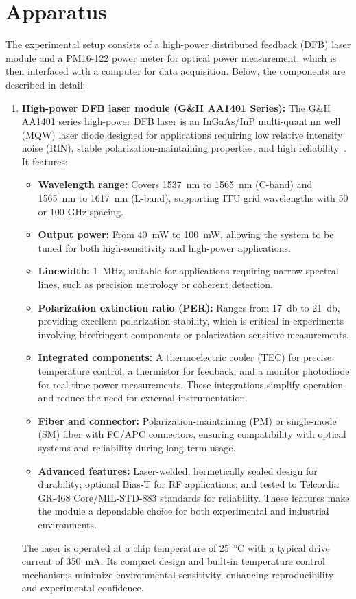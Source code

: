 \documentclass[prl,twocolumn]{revtex4-1}
\begin{document}
\section{Apparatus}

The experimental setup consists of a high-power distributed feedback (DFB) laser module and a PM16-122 power meter for optical power measurement, which is then interfaced with a computer for data acquisition. Below, the components are described in detail:

\begin{enumerate}
    \item \textbf{High-power DFB laser module (G\&H AA1401 Series):}
    The G\&H AA1401 series high-power DFB laser is an InGaAs/InP multi-quantum well (MQW) laser diode designed for applications requiring low relative intensity noise (RIN), stable polarization-maintaining properties, and high reliability~\cite{pap4}. It features:
    \begin{itemize}[noitemsep]
        \item \textbf{Wavelength range:} Covers \SI{1537}{\nano\meter} to \SI{1565}{\nano\meter} (C-band) and \SI{1565}{\nano\meter} to \SI{1617}{\nano\meter} (L-band), supporting ITU grid wavelengths with 50 or 100 GHz spacing.
        \item \textbf{Output power:} From \SI{40}{\milli\watt} to \SI{100}{\milli\watt}, allowing the system to be tuned for both high-sensitivity and high-power applications.
        \item \textbf{Linewidth:} \SI{1}{\mega\hertz}, suitable for applications requiring narrow spectral lines, such as precision metrology or coherent detection.
        \item \textbf{Polarization extinction ratio (PER):} Ranges from \SI{17}{\decibel} to \SI{21}{\decibel}, providing excellent polarization stability, which is critical in experiments involving birefringent components or polarization-sensitive measurements.
        \item \textbf{Integrated components:} A thermoelectric cooler (TEC) for precise temperature control, a thermistor for feedback, and a monitor photodiode for real-time power measurements. These integrations simplify operation and reduce the need for external instrumentation.
        \item \textbf{Fiber and connector:} Polarization-maintaining (PM) or single-mode (SM) fiber with FC/APC connectors, ensuring compatibility with optical systems and reliability during long-term usage.
        \item \textbf{Advanced features:} Laser-welded, hermetically sealed design for durability; optional Bias-T for RF applications; and tested to Telcordia GR-468 Core/MIL-STD-883 standards for reliability. These features make the module a dependable choice for both experimental and industrial environments.
    \end{itemize}
    The laser is operated at a chip temperature of \SI{25}{\degreeCelsius} with a typical drive current of \SI{350}{\milli\ampere}. Its compact design and built-in temperature control mechanisms minimize environmental sensitivity, enhancing reproducibility and experimental confidence.


\end{enumerate}
\end{document}
